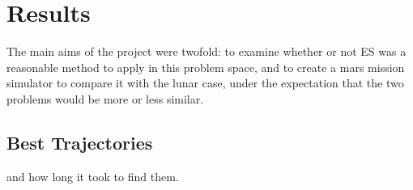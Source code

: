 
\chapter{Results}
The main aims of the project were twofold: to examine whether or not ES was a reasonable method to apply in this problem space, and to create a mars mission simulator to compare it with the lunar case, under the expectation that the two problems would be more or less similar. 



\section{Best Trajectories}
and how long it took to ﬁnd them.